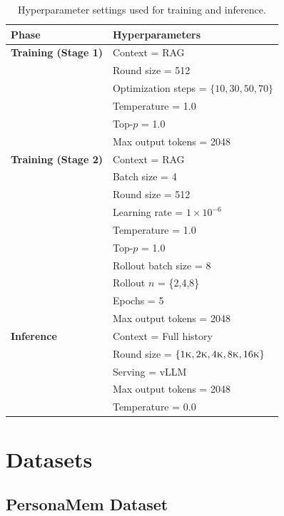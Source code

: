 \begin{table}[t]
\centering
\small
\setlength{\tabcolsep}{4pt}
\renewcommand{\arraystretch}{1.05}
\begin{tabular}{l l}
\toprule
\textbf{Phase} & \textbf{Hyperparameters} \\
\midrule
\textbf{Training (Stage 1)} & Context = RAG \\
& Round size = 512 \\
& Optimization steps = $\{10, 30, 50, 70\}$ \\
& Temperature = 1.0 \\
& Top-$p$ = 1.0 \\
& Max output tokens = 2048 \\
\midrule
\textbf{Training (Stage 2)} & Context = RAG \\
& Batch size = 4 \\
& Round size = 512 \\
& Learning rate = $1 \times 10^{-6}$ \\
& Temperature = 1.0 \\
& Top-$p$ = 1.0 \\
& Rollout batch size = 8 \\
& Rollout $n$ = \{2,4,8\} \\
& Epochs = 5 \\
& Max output tokens = 2048 \\
\midrule
\textbf{Inference} & Context = Full history \\
& Round size = $\{1\textsc{k}, 2\textsc{k}, 4\textsc{k}, 8\textsc{k}, 16\textsc{k}\}$ \\
& Serving = vLLM \\
& Max output tokens = 2048 \\
& Temperature = 0.0 \\
\bottomrule
\end{tabular}
\caption{Hyperparameter settings used for training and inference.}
\label{tab:hyperparameters}
\end{table}




\section{Datasets} 
\label{app:Datasets}


\subsection{PersonaMem Dataset}
\label{app:personamem-dataset}

